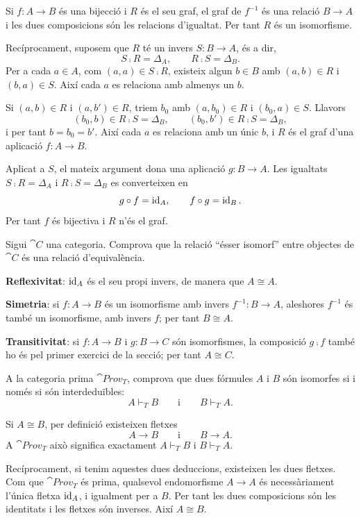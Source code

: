 \begin{solucio}
Si $f\colon A\to B$ és una bijecció i $R$ és el seu graf, el graf de $f^{-1}$ és una relació $B\to A$ i les dues composicions són les relacions d'igualtat. Per tant $R$ és un isomorfisme.

Recíprocament, suposem que $R$ té un invers $S\colon B\to A$, és a dir,
\[
S\comp R=\Delta_A,
\qquad
R\comp S=\Delta_B.
\]
Per a cada $a\in A$, com $(a,a)\in S\comp R$, existeix algun $b\in B$ amb $(a,b)\in R$ i $(b,a)\in S$. Així cada $a$ es relaciona amb almenys un $b$.

Si $(a,b)\in R$ i $(a,b')\in R$, triem $b_0$ amb $(a,b_0)\in R$ i $(b_0,a)\in S$. Llavors
\[
(b_0,b)\in R\comp S=\Delta_B,
\qquad
(b_0,b')\in R\comp S=\Delta_B,
\]
i per tant $b=b_0=b'$. Així cada $a$ es relaciona amb un únic $b$, i $R$ és el graf d'una aplicació $f\colon A\to B$.

Aplicat a $S$, el mateix argument dona una aplicació $g\colon B\to A$. Les igualtats $S\comp R=\Delta_A$ i $R\comp S=\Delta_B$ es converteixen en
\[
g\circ f=\operatorname{id}_A,
\qquad
f\circ g=\operatorname{id}_B.
\]
Per tant $f$ és bijectiva i $R$ n'és el graf.
\end{solucio}

\begin{exercici}
Sigui $\cat{C}$ una categoria. Comprova que la relació \enquote{ésser isomorf} entre objectes de $\cat{C}$ és una relació d'equivalència.
\end{exercici}

\begin{solucio}
\textbf{Reflexivitat}: $\operatorname{id}_A$ és el seu propi invers, de manera que $A\cong A$.

\textbf{Simetria}: si $f\colon A\to B$ és un isomorfisme amb invers $f^{-1}\colon B\to A$, aleshores $f^{-1}$ és també un isomorfisme, amb invers $f$; per tant $B\cong A$.

\textbf{Transitivitat}: si $f\colon A\to B$ i $g\colon B\to C$ són isomorfismes, la composició $g\comp f$ també ho és pel primer exercici de la secció; per tant $A\cong C$.
\end{solucio}

\begin{exercici}
A la categoria prima $\cat{Prov}_T$, comprova que dues fórmules $A$ i $B$ són isomorfes si i només si són interdeduïbles:
\[
A\vdash_T B
\qquad\text{i}\qquad
B\vdash_T A.
\]
\end{exercici}

\begin{solucio}
Si $A\cong B$, per definició existeixen fletxes
\[
A\longrightarrow B
\qquad\text{i}\qquad
B\longrightarrow A.
\]
A $\cat{Prov}_T$ això significa exactament $A\vdash_T B$ i $B\vdash_T A$.

Recíprocament, si tenim aquestes dues deduccions, existeixen les dues fletxes. Com que $\cat{Prov}_T$ és prima, qualsevol endomorfisme $A\to A$ és necessàriament l'única fletxa $\operatorname{id}_A$, i igualment per a $B$. Per tant les dues composicions són les identitats i les fletxes són inverses. Així $A\cong B$.
\end{solucio}

